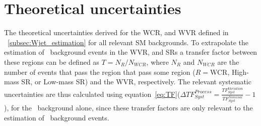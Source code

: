 \chapter{Theoretical uncertainties}
\label{app:analysis}

The theoretical uncertainties derived for the W\ac{CR}, and W\ac{VR} defined in ~\ref{subsec:Wjet_estimation} for all relevant \ac{SM} backgrounds.
To extrapolate the estimation of \Wjets\ background events in the WVR, and \acp{SR} a transfer factor between these regions can be defined as $T=N_{R}/N_{WCR}$, where $N_{R}$ and $N_{WCR}$ are the number of events that pass the region that pass some region ($R=$WCR, High-mass SR, or Low-mass SR) and the W\ac{VR}, respectively. 
The relevant systematic uncertainties are thus calculated using equation~\ref{eq:TF}($\Delta TF_{Syst}^{Process}=\frac{TF_{Syst}^{Variation}}{TF_{Syst}^{Nominal}}-1$), for the \Wjets\ background alone, since these transfer factors are only relevant to the estimation of \Wjets\ background events. 

